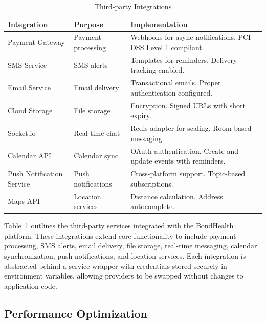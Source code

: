 \begin{table}[H]
\small
\centering
\caption{Third-party Integrations}
\label{tab:integrations}
\renewcommand{\arraystretch}{1.3}
\begin{tabular}{|>{\raggedright\arraybackslash}p{3.0cm}|>{\raggedright\arraybackslash}p{2.8cm}|>{\raggedright\arraybackslash}p{7.6cm}|}
\hline
\textbf{Integration} & \textbf{Purpose} & \textbf{Implementation} \\
\hline
Payment Gateway & Payment processing & Webhooks for async notifications. PCI DSS Level 1 compliant. \\
\hline
SMS Service & SMS alerts & Templates for reminders. Delivery tracking enabled. \\
\hline
Email Service & Email delivery & Transactional emails. Proper authentication configured. \\
\hline
Cloud Storage & File storage & Encryption. Signed URLs with short expiry. \\
\hline
Socket.io & Real-time chat & Redis adapter for scaling. Room-based messaging. \\
\hline
Calendar API & Calendar sync & OAuth authentication. Create and update events with reminders. \\
\hline
Push Notification Service & Push notifications & Cross-platform support. Topic-based subscriptions. \\
\hline
Maps API & Location services & Distance calculation. Address autocomplete. \\
\hline
\end{tabular}
\end{table}
\noindent Table~\ref{tab:integrations} outlines the third-party services integrated with the BondHealth platform. These integrations extend core functionality to include payment processing, SMS alerts, email delivery, file storage, real-time messaging, calendar synchronization, push notifications, and location services. Each integration is abstracted behind a service wrapper with credentials stored securely in environment variables, allowing providers to be swapped without changes to application code.
\FloatBarrier

\subsection{Performance Optimization}


